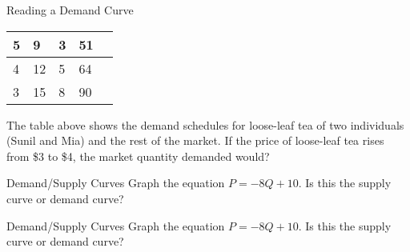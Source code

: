 \documentclass{beamer}
\begin{document}
\begin{frame}[t]{Reading a Demand Curve}
\begin{table}[]
\begin{tabular}{|l|l|l|l|l|}
    5                                                                                 & 9                                                                          & 3                                                                        & 51                                                                                &                                                                           \\ \hline
    4                                                                                 & 12                                                                         & 5                                                                        & 64                                                                                &                                                                           \\ \hline
    3                                                                                 & 15                                                                         & 8                                                                        & 90                                                                                &                                                                           \\ \hline
    \end{tabular}
    \end{table}
    The table above shows the demand schedules for loose-leaf tea of two individuals (Sunil and Mia) and the rest of the market. If the price of loose-leaf tea rises from \$3 to \$4, the market quantity demanded would?
\end{frame}

\begin{frame}[t]{Demand/Supply Curves}
    Graph the equation $P = -8Q + 10$. Is this the supply curve or demand curve?
\end{frame}

\begin{frame}[t]{Demand/Supply Curves}
    Graph the equation $P = -8Q + 10$. Is this the supply curve or demand curve?
\end{frame}
\end{document}
